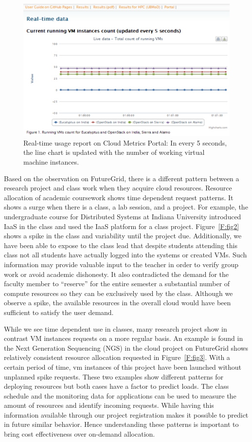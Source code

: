 \documentclass{sig-alternate-05-2015}
\begin{document}
\begin{figure}[htb] 
  \centering 
    \includegraphics[width=1.0\columnwidth]{images/metrics-portal-realtime.pdf} 
  \caption{Real-time usage report on Cloud Metrics Portal: In every 5 seconds, the line chart is updated with the number of working virtual machine instances.}\label{F:fig9} 
\end{figure} 

Based on the observation on FutureGrid, there is a different pattern
between a research project and class work when they acquire cloud
resources. Resource allocation of academic coursework shows time
dependent request patterns. It shows a surge when there is a class, a
lab session, and a project. For example, the undergraduate course for
Distributed Systems at Indiana University introduced IaaS in the class
and used the IaaS platform for a class project. Figure~\ref{F:fig2}
shows a spike in the class and variability until the project due. 
Additionally, we have been able to expose to the class lead that
despite students attending this class not all students have actually
logged into the systems or created VMs. Such information may provide
valuable input to the teacher in order to verify group work or avoid
academic dishonesty. It also contradicted the demand for the faculty
member to ``reserve'' for the entire semester a substantial number of
compute resources so they can be exclusively used by the
class. Although we observe a spike, the available resources in the
overall cloud would have been sufficient to satisfy the user demand.

While we see time dependent use in classes, many research project show
in contrast VM instances requests on a more regular basis. An example
is found in the Next Generation Sequencing (NGS) in the cloud project
on FutureGrid shows relatively consistent resource allocation
requested in Figure~\ref{F:fig3}. With a certain period of time, vm
instances of this project have been launched without unplanned spike
requests. These two examples show different patterns for deploying
resources but both cases have a factor to predict loads. The class
schedule and the monitoring data for applications can be used to
measure the amount of resources and identify incoming requests.  While
having this information available through our project registration
makes it possible to predict in future similar behavior.  Hence
understanding these patterns is important to bring cost effectiveness
over on-demand allocation.
\end{document}
